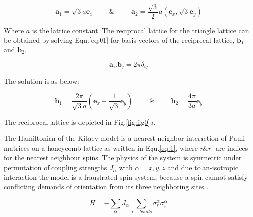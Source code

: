 \documentclass{article}
\begin{document}
\begin{equation}\label{eq:0}
    \textbf{a}_1 = \sqrt{3} a \textbf{e}_x \hspace{1cm} \& \hspace{1cm}
    \textbf{a}_2 = \frac{\sqrt{3}}{2} a (\textbf{e}_x, \sqrt{3}\textbf{e}_y)
\end{equation}

Where $a$ is the lattice constant. The reciprocal lattice for the triangle lattice can be obtained by solving Equ.\hspace{0.2mm}\ref{eq:01} for basis vectors of the reciprocal lattice, $\textbf{b}_1$ and $\textbf{b}_2$.

\begin{equation}\label{eq:01}
    \textbf{a}_i.\textbf{b}_j = 2\pi\delta_{ij}
\end{equation}

The solution is as below:

\begin{equation}\label{eq:02}
    \textbf{b}_1 = \frac{2\pi}{\sqrt{3}a} (\textbf{e}_x-\frac{1}{\sqrt{3}}\textbf{e}_y) \hspace{1cm} \& \hspace{1cm}
    \textbf{b}_2 = \frac{4\pi}{3a} \textbf{e}_y
\end{equation}

The reciprocal lattice is depicted in Fig.\hspace{0.2mm}\ref{fig:fig0}b. 

The Hamiltonian of the Kitaev model is a nearest-neighbor interaction of Pauli matrices on a honeycomb lattice as written in Equ.\hspace{0.2mm}\ref{eq:1}, where $r \& r^{'}$ are indices for the nearest neighbour spins. The physics of the system is symmetric under permutation of coupling strengths $J_{\alpha}$ with $\alpha = x, y, z$ and due to an-isotropic interaction the model is a fraustrated spin system, because a spin cannot satisfy conflicting
 demands of orientation from its three neighboring sites \cite{Kitaev_2006}.

\begin{equation}\label{eq:1}
    H = - \sum_{\alpha} J_{\alpha} \sum_{\alpha-bonds} \sigma^{\alpha}_{r}\sigma^{\alpha}_{r^{'}}
\end{equation}
\end{document}
